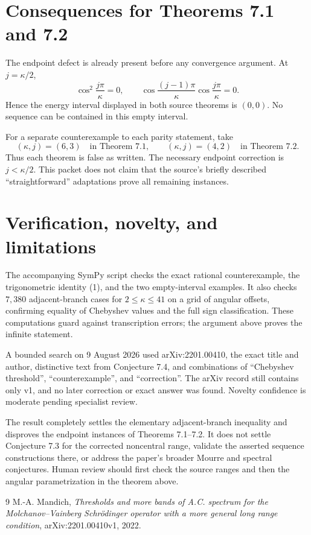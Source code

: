 \documentclass[11pt]{article}
\begin{document}
\section{Consequences for Theorems 7.1 and 7.2}

The endpoint defect is already present before any convergence argument.  At
$j=\kappa/2$,
\[
 \cos^2\!\frac{j\pi}{\kappa}=0,
 \qquad
 \cos\!\frac{(j-1)\pi}{\kappa}\cos\!\frac{j\pi}{\kappa}=0.
\]
Hence the energy interval displayed in both source theorems is $(0,0)$.
No sequence can be contained in this empty interval.

For a separate counterexample to each parity statement, take
\[
 (\kappa,j)=(6,3)\quad\text{in Theorem 7.1},
 \qquad
 (\kappa,j)=(4,2)\quad\text{in Theorem 7.2}.
\]
Thus each theorem is false as written.  The necessary endpoint correction is
$j<\kappa/2$.  This packet does not claim that the source's briefly described
``straightforward'' adaptations prove all remaining instances.

\section{Verification, novelty, and limitations}

The accompanying SymPy script checks the exact rational counterexample, the
trigonometric identity (1), and the two empty-interval examples.  It also
checks $7{,}380$ adjacent-branch cases for $2\leq\kappa\leq41$ on a grid of
angular offsets, confirming equality of Chebyshev values and the full sign
classification.  These computations guard against transcription errors; the
argument above proves the infinite statement.

A bounded search on 9 August 2026 used arXiv:2201.00410, the exact title and
author, distinctive text from Conjecture 7.4, and combinations of
``Chebyshev threshold'', ``counterexample'', and ``correction''.  The arXiv
record still contains only v1, and no later correction or exact answer was
found.  Novelty confidence is moderate pending specialist review.

The result completely settles the elementary adjacent-branch inequality and
disproves the endpoint instances of Theorems 7.1--7.2.  It does not settle
Conjecture 7.3 for the corrected noncentral range, validate the asserted
sequence constructions there, or address the paper's broader Mourre and
spectral conjectures.  Human review should first check the source ranges and
then the angular parametrization in the theorem above.

\begin{thebibliography}{9}
M.-A. Mandich,
\emph{Thresholds and more bands of A.C. spectrum for the
Molchanov--Vainberg Schrödinger operator with a more general long range
condition}, arXiv:2201.00410v1, 2022.
\end{thebibliography}
\end{document}
